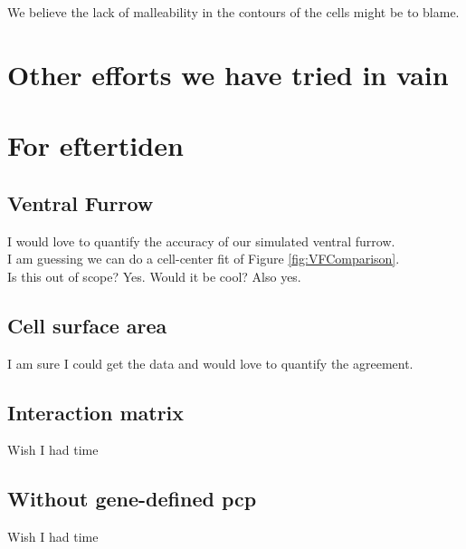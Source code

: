 We believe the lack of malleability in the contours of the cells might be to blame.






\section*{Other efforts we have tried in vain}
\section*{For eftertiden}
\subsection{Ventral Furrow}
I would love to quantify the accuracy of our simulated ventral furrow.\\
I am guessing we can do a cell-center fit of Figure \ref{fig:VFComparison}.\\
Is this out of scope? Yes. Would it be cool? Also yes.

\subsection{Cell surface area}
I am sure I could get the data and would love to quantify the agreement.

\subsection{Interaction matrix}
Wish I had time

\subsection{Without gene-defined pcp}
Wish I had time

